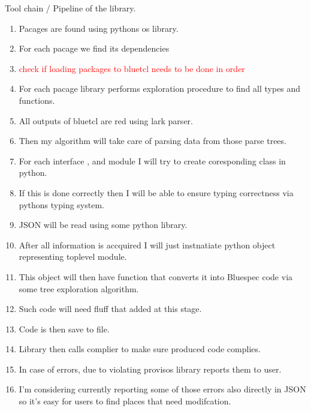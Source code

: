 \documentclass[14pt]{article}
\newcommand\todo[1]{\textcolor{red}{#1}}
\begin{document}
    Tool chain / Pipeline of the library. 
    \begin{enumerate}
        \item Pacages are found using pythons os library. 
        \item For each pacage we find its dependencies
        \item \todo{check if loading packages to bluetcl needs to be done in order}
        \item For each pacage library performs exploration procedure to find all types and functions.
        \item All outputs of bluetcl are red using lark parser. 
        \item Then my algorithm will take care of parsing data from those parse trees. 
        \item For each interface , and module I will try to create coresponding class in python. 
        \item If this is done correctly then I will be able to ensure typing correctness via pythons typing system. 
        \item JSON will be read using some python library.
        \item After all information is accquired I will just instnatiate python object representing toplevel module. 
        \item This object will then have function that converts it into Bluespec code via some tree exploration algorithm.
        \item Such code will need fluff that added at this stage. 
        \item Code is then save to file. 
        \item Library then calls complier to make sure produced code complies. 
        \item In case of errors, due to violating provisos library reports them to user. 
        \item I'm considering currently reporting some of those errors also directly in JSON so it's easy for users to find places that need modifcation. 
    \end{enumerate}
\end{document}

